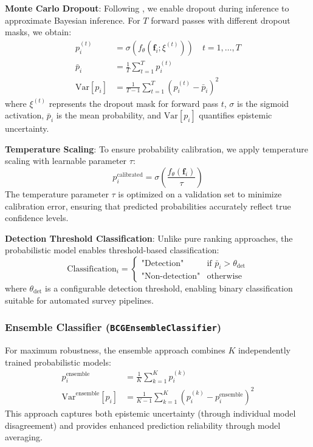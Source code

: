 \documentclass[twocolumn,10pt]{aastex631}
\begin{document}
\textbf{Monte Carlo Dropout}: Following \citet{Gal2016MCDropout}, we enable dropout during inference to approximate Bayesian inference. For $T$ forward passes with different dropout masks, we obtain:
\begin{align}
p_i^{(t)} &= \sigma(f_{\theta}(\mathbf{f}_i; \xi^{(t)})) \quad t = 1, \ldots, T \\
\bar{p}_i &= \frac{1}{T} \sum_{t=1}^T p_i^{(t)} \\
\text{Var}[p_i] &= \frac{1}{T-1} \sum_{t=1}^T (p_i^{(t)} - \bar{p}_i)^2
\end{align}
where $\xi^{(t)}$ represents the dropout mask for forward pass $t$, $\sigma$ is the sigmoid activation, $\bar{p}_i$ is the mean probability, and $\text{Var}[p_i]$ quantifies epistemic uncertainty.

\textbf{Temperature Scaling}: To ensure probability calibration, we apply temperature scaling \citep{Laves2019WellCalibratedMU} with learnable parameter $\tau$:
\begin{equation}
p_i^{\text{calibrated}} = \sigma\left(\frac{f_{\theta}(\mathbf{f}_i)}{\tau}\right)
\end{equation}
The temperature parameter $\tau$ is optimized on a validation set to minimize calibration error, ensuring that predicted probabilities accurately reflect true confidence levels.

\textbf{Detection Threshold Classification}: Unlike pure ranking approaches, the probabilistic model enables threshold-based classification:
\begin{equation}
\text{Classification}_i = \begin{cases}
\text{"Detection"} & \text{if } \bar{p}_i > \theta_{\text{det}} \\
\text{"Non-detection"} & \text{otherwise}
\end{cases}
\end{equation}
where $\theta_{\text{det}}$ is a configurable detection threshold, enabling binary classification suitable for automated survey pipelines.

\subsubsection{Ensemble Classifier (\texttt{BCGEnsembleClassifier})}
For maximum robustness, the ensemble approach combines $K$ independently trained probabilistic models:
\begin{align}
p_i^{\text{ensemble}} &= \frac{1}{K} \sum_{k=1}^K p_i^{(k)} \\
\text{Var}^{\text{ensemble}}[p_i] &= \frac{1}{K-1} \sum_{k=1}^K (p_i^{(k)} - p_i^{\text{ensemble}})^2
\end{align}
This approach captures both epistemic uncertainty (through individual model disagreement) and provides enhanced prediction reliability through model averaging.
\end{document}
